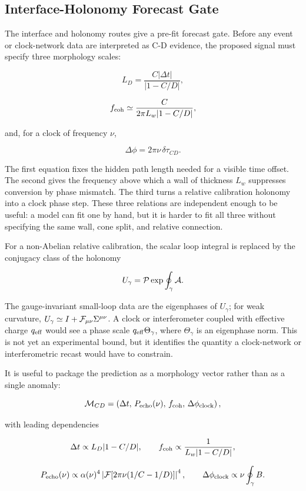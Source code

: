 \documentclass[11pt]{article}
\begin{document}
\subsection{Interface-Holonomy Forecast Gate}


The interface and holonomy routes give a pre-fit forecast gate. Before any event or clock-network data are interpreted as C-D evidence, the proposed signal must specify three morphology scales:


\[
L_D=\frac{C|\Delta t|}{|1-C/D|},
\]


\[
f_{\rm coh}\simeq \frac{C}{2\pi L_w |1-C/D|},
\]


and, for a clock of frequency \(\nu\),


\[
\Delta\phi=2\pi\nu\,\delta\tau_{CD}.
\]


The first equation fixes the hidden path length needed for a visible time offset. The second gives the frequency above which a wall of thickness \(L_w\) suppresses conversion by phase mismatch. The third turns a relative calibration holonomy into a clock phase step. These three relations are independent enough to be useful: a model can fit one by hand, but it is harder to fit all three without specifying the same wall, cone split, and relative connection.


For a non-Abelian relative calibration, the scalar loop integral is replaced by the conjugacy class of the holonomy


\[
U_\gamma={\cal P}\exp\oint_\gamma {\cal A}.
\]


The gauge-invariant small-loop data are the eigenphases of \(U_\gamma\); for weak curvature, \(U_\gamma\simeq I+{\cal F}_{\mu\nu}\Sigma^{\mu\nu}\). A clock or interferometer coupled with effective charge \(q_{\rm eff}\) would see a phase scale \(q_{\rm eff}\Theta_\gamma\), where \(\Theta_\gamma\) is an eigenphase norm. This is not yet an experimental bound, but it identifies the quantity a clock-network or interferometric recast would have to constrain.


It is useful to package the prediction as a morphology vector rather than as a single anomaly:


\[
{\cal M}_{CD}=
\left(
\Delta t,\,
P_{\rm echo}(\nu),\,
f_{\rm coh},\,
\Delta\phi_{\rm clock}
\right),
\]


with leading dependencies


\[
\Delta t\propto L_D |1-C/D|,
\qquad
f_{\rm coh}\propto \frac{1}{L_w |1-C/D|},
\]


\[
P_{\rm echo}(\nu)\propto
\alpha(\nu)^4
\left|{\cal F}\!\left[2\pi\nu(1/C-1/D)\right]\right|^4,
\qquad
\Delta\phi_{\rm clock}\propto\nu\oint_\gamma B .
\]
\end{document}
